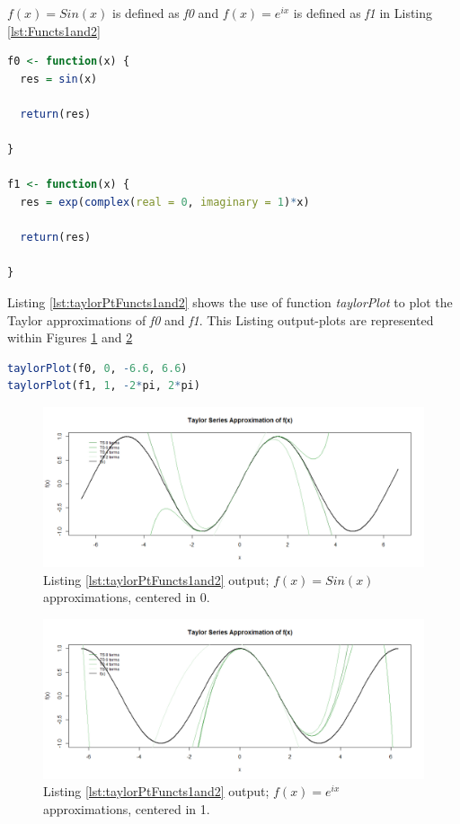 \documentclass[11pt,a4paper]{article}
\begin{document}
$ f(x) = Sin(x) $ is defined as \emph{f0} and $ f(x) = e^{ix} $ is defined as \emph{f1} in  Listing \ref{lst:Functs1and2}

\begin{lstlisting}[frame=trBL, language=R, caption="Define \emph{f0} and \emph{f1}"
\label{lst:Functs1and2}]
f0 <- function(x) {
  res = sin(x)

  return(res)

}

f1 <- function(x) {
  res = exp(complex(real = 0, imaginary = 1)*x)
  
  return(res)
  
}
\end{lstlisting}

Listing \ref{lst:taylorPtFuncts1and2} shows the use of function \emph{taylorPlot} to plot the Taylor approximations of \emph{f0} and \emph{f1}. This Listing output-plots are represented within Figures \ref{fig:SinOfx_taylor} and \ref{fig:ExpOfix_taylor}

\begin{lstlisting}[frame=trBL, language=R, caption="Implement \emph{taylorPlot}"
\label{lst:taylorPtFuncts1and2}]
taylorPlot(f0, 0, -6.6, 6.6)
taylorPlot(f1, 1, -2*pi, 2*pi)
\end{lstlisting}

\begin{figure}[!h]
\centering
\includegraphics[width=\textwidth]{./img/SinOfx_taylor.png}
\caption{Listing \ref{lst:taylorPtFuncts1and2} output; $ f(x) = Sin(x) $ approximations, centered in 0.\label{fig:SinOfx_taylor}}
\end{figure}

\begin{figure}[!h]
\centering
\includegraphics[width=\textwidth]{./img/ExpOfix_taylor.png}
\caption{Listing \ref{lst:taylorPtFuncts1and2} output; $ f(x) = e^{ix} $ approximations, centered in 1.\label{fig:ExpOfix_taylor}}
\end{figure}
\end{document}
